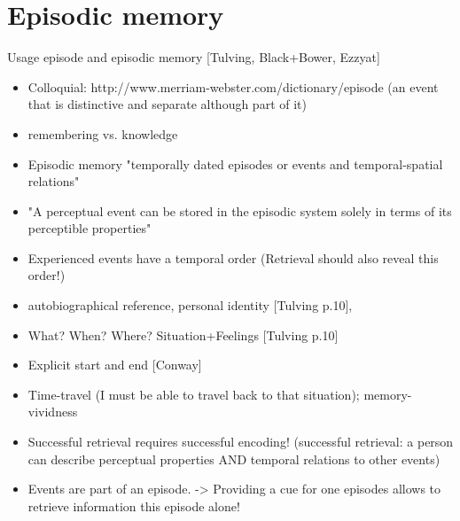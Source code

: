\section{Episodic memory}
Usage episode and episodic memory [Tulving, Black+Bower, Ezzyat]
\begin{itemize}
\item Colloquial:  http://www.merriam-webster.com/dictionary/episode (an event that is distinctive and separate although part of it)
\item remembering vs. knowledge \cite{tulving_concepts_2000}

\item Episodic memory "temporally dated episodes or events and temporal-spatial relations" \cite[385]{tulving_concepts_2000}
\item "A perceptual event can be stored in the episodic system solely in terms of its perceptible properties"\cite[p. 385]{tulving_concepts_2000}
\item Experienced events have a temporal order (Retrieval should also reveal this order!)\cite{tulving_concepts_2000}

\item autobiographical reference, personal identity [Tulving p.10], \cite{conway_construction_????}
\item What? When? Where? Situation+Feelings [Tulving p.10]
\item Explicit start and end [Conway]
\item Time-travel (I must be able to travel back to that situation); memory-vividness \cite{conway_construction_????}

      
\item Successful retrieval requires successful encoding! (successful retrieval: a person can describe perceptual properties AND temporal relations to other events)

\item Events are part of an episode. -> Providing a cue for one episodes allows to retrieve information this episode alone!
\end{itemize}

